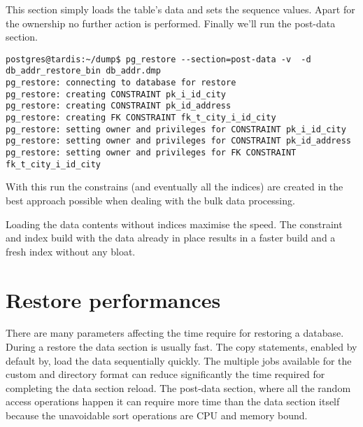 This section simply loads the table's data and sets the sequence values. Apart for the ownership no 
further action is performed. Finally we'll run the post-data section.

\begin{verbatim}
postgres@tardis:~/dump$ pg_restore --section=post-data -v  -d db_addr_restore_bin db_addr.dmp 
pg_restore: connecting to database for restore
pg_restore: creating CONSTRAINT pk_i_id_city
pg_restore: creating CONSTRAINT pk_id_address
pg_restore: creating FK CONSTRAINT fk_t_city_i_id_city
pg_restore: setting owner and privileges for CONSTRAINT pk_i_id_city
pg_restore: setting owner and privileges for CONSTRAINT pk_id_address
pg_restore: setting owner and privileges for FK CONSTRAINT fk_t_city_i_id_city

\end{verbatim}

With this run the constrains (and eventually all the indices) are created in the best 
approach possible when dealing with the bulk data processing. \newline

Loading the data contents without indices maximise the speed. The constraint and index build with 
the data already in place results in a faster build and a fresh index without any bloat.

\section{Restore performances}

There are many parameters affecting the time require for restoring a database. During a restore the
 data section is usually fast. The copy statements, enabled by default by, load the data
sequentially quickly. The multiple jobs available for the custom and directory format can
reduce significantly the time required for completing the data section reload. The post-data
section, where all the random access operations happen it can require more time than the data
section itself because the unavoidable sort operations are CPU and memory bound. 
